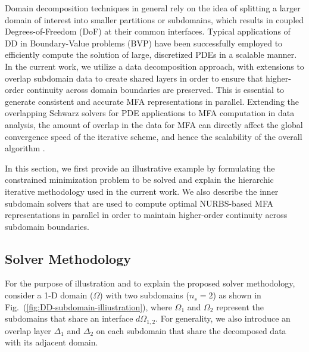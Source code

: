 \documentclass[conference]{IEEEtran}
\newcommand{\fig}[1]{Fig.~(\ref{#1})}
\begin{document}
Domain decomposition techniques in general rely on the idea of splitting a larger domain of interest into smaller partitions or subdomains, which results in coupled Degrees-of-Freedom (DoF) at their common interfaces. Typical applications of DD in Boundary-Value problems (BVP) \cite{smith-ddm, lions-asm} have been successfully employed to efficiently compute the solution of large, discretized PDEs in a scalable manner. In the current work, we utilize a data decomposition approach, with extensions to overlap subdomain data to create shared layers in order to ensure that higher-order continuity across domain boundaries are preserved. This is essential to generate consistent and accurate MFA representations in parallel. Extending the overlapping Schwarz solvers for PDE applications to MFA computation in data analysis, the amount of overlap in the data for MFA can directly affect the global convergence speed of the iterative scheme, and hence the scalability of the overall algorithm \cite{bjorstad-overlap-1989}. %

In this section, we first provide an illustrative example by formulating the constrained minimization problem to be solved and explain the hierarchic iterative methodology used in the current work. We also describe the inner subdomain solvers that are used to compute optimal NURBS-based MFA representations in parallel in order to maintain higher-order continuity across subdomain boundaries.



\subsection{Solver Methodology}
\label{sec:solver-methodology}

For the purpose of illustration and to explain the proposed solver methodology, consider a 1-D domain ($\Omega$) with two subdomains ($n_s=2$) as shown in \fig{fig:DD-subdomain-illiustration}, where $\Omega_1$ and $\Omega_2$ represent the subdomains that share an interface $d\Omega_{1,2}$. For generality, we also introduce an overlap layer $\Delta_1$ and $\Delta_2$ on each subdomain that share the decomposed data with its adjacent domain. 
\end{document}
